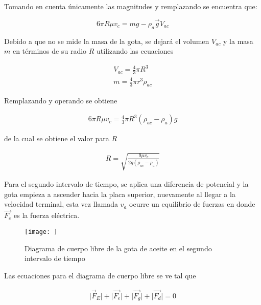 Tomando en cuenta únicamente las magnitudes y remplazando se encuentra que:

\begin{equation}
    6\pi R\mu v_c=mg-\rho_a \Vec{g}V_{ac}
\end{equation}

Debido a que no se mide la masa de la gota, se dejará el volumen $V_{ac}$ y la masa $m$ en términos de su radio $R$ utilizando las ecuaciones

\begin{equation}
    \begin{split}
        V_{ac}=\frac{4}{3}\pi R^3\\
        m=\frac{4}{3}\pi r^3\rho_{ac}
    \end{split}
\end{equation}

Remplazando y operando se obtiene

\begin{equation}
    \begin{split}
        6\pi R\mu v_c=\frac{4}{3}\pi R^3(\rho_{ac}-\rho_a)g
    \end{split}
\end{equation}

de la cual se obtiene el valor para $R$

\begin{equation}
    \begin{split}
        R=\sqrt{\frac{9\mu v_c}{2g(\rho_{ac}-\rho_a)}}
    \end{split}
\end{equation}

Para el segundo intervalo de tiempo, se aplica una diferencia de potencial y la gota empieza a ascender hacia la placa superior, nuevamente al llegar a la velocidad terminal, esta vez llamada $v_a$ ocurre un equilibrio de fuerzas en donde $\Vec{F_e}$ es la fuerza eléctrica.

\begin{figure}
    \centering
    \texttt{[image: ]}
    \caption{Diagrama de cuerpo libre de la gota de aceite en el segundo intervalo de tiempo}
    \label{fig:enter-label}
\end{figure}

Las ecuaciones para el diagrama de cuerpo libre se ve tal que

\begin{equation}
    \begin{split}
        \lvert\Vec{F}_E\rvert + \lvert \Vec{F_e}\rvert + \lvert \Vec{F_g}\rvert+\lvert \Vec{F_d}\rvert =0
    \end{split}
\end{equation}

